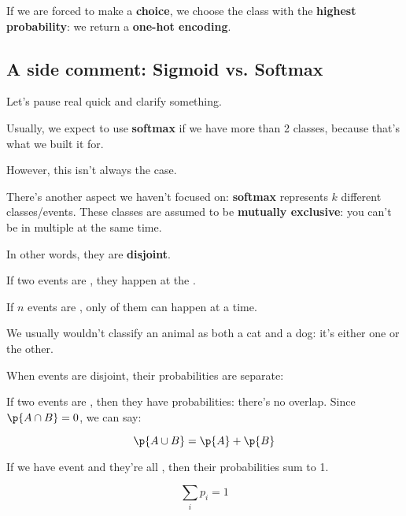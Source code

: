         
        If we are forced to make a \textbf{choice}, we choose the class with the \textbf{highest probability}: we return a \textbf{one-hot encoding}.

        \subsection*{A side comment: Sigmoid vs. Softmax}

            Let's pause real quick and clarify something.

            Usually, we expect to use \textbf{softmax} if we have more than 2 classes, because that's what we built it for.

            However, this isn't always the case. 
            
            There's another aspect we haven't focused on: \textbf{softmax} represents $k$ different classes/events. These classes are assumed to be \textbf{mutually exclusive}: you can't be in multiple at the same time.

            In other words, they are \textbf{disjoint}.\\

            \begin{definition}
                If two events are , they  happen at the .

                If $n$ events are , only  of them can happen at a time.
            \end{definition}

            \miniex We usually wouldn't classify an animal as both a cat and a dog: it's either one or the other.

            When events are disjoint, their probabilities are separate:\\

            \begin{concept}
                If two events are , then they have  probabilities: there's no overlap. Since $\p{A \cap B}=0$, we can say:

                \begin{equation*}
                    \p{A \cup B} = \p{A}+\p{B}
                \end{equation*}

                If we have  event and they're all , then their probabilities sum to 1.

                \begin{equation}
                    \sum_i p_i = 1
                \end{equation}
            \end{concept}


